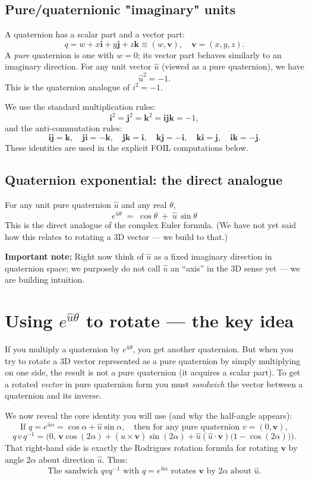 \documentclass[11pt]{article}
\begin{document}
\subsection{Pure/quaternionic "imaginary" units}
A quaternion has a scalar part and a vector part:
\[
q = w + x\mathbf{i} + y\mathbf{j} + z\mathbf{k}
  \equiv (w,\mathbf{v}),\quad \mathbf{v}=(x,y,z).
\]
A \emph{pure} quaternion is one with \(w=0\); its vector part behaves similarly to an imaginary direction. For any unit vector \(\hat{u}\) (viewed as a pure quaternion), we have
\[
\hat{u}^2 = -1.
\]
This is the quaternion analogue of \(i^2=-1\).

We use the standard multiplication rules:
\[
\mathbf{i}^2 = \mathbf{j}^2 = \mathbf{k}^2 = \mathbf{ijk} = -1,
\]
and the anti-commutation rules:
\[
\mathbf{i}\mathbf{j}=\mathbf{k},\quad \mathbf{j}\mathbf{i}=-\mathbf{k},\quad
\mathbf{j}\mathbf{k}=\mathbf{i},\quad \mathbf{k}\mathbf{j}=-\mathbf{i},\quad
\mathbf{k}\mathbf{i}=\mathbf{j},\quad \mathbf{i}\mathbf{k}=-\mathbf{j}.
\]
These identities are used in the explicit FOIL computations below.

\subsection{Quaternion exponential: the direct analogue}
For any unit pure quaternion \(\hat{u}\) and any real \(\theta\),
\[
\boxed{ \; e^{\hat{u}\theta} \;=\; \cos\theta \;+\; \hat{u}\,\sin\theta \; }
\]
This is the direct analogue of the complex Euler formula. (We have not yet said how this relates to rotating a 3D vector — we build to that.)

\bigskip
\noindent\textbf{Important note:} Right now think of \(\hat{u}\) as a fixed imaginary direction in quaternion space; we purposely do not call \(\hat{u}\) an ``axis'' in the 3D sense yet — we are building intuition.

\section{Using \(e^{\hat{u}\theta}\) to rotate — the key idea}
If you multiply a quaternion by \(e^{\hat{u}\theta}\), you get another quaternion. But when you try to rotate a 3D vector represented as a pure quaternion by simply multiplying on one side, the result is not a pure quaternion (it acquires a scalar part). To get a rotated \emph{vector} in pure quaternion form you must \emph{sandwich} the vector between a quaternion and its inverse.

We now reveal the core identity you will use (and why the half-angle appears):
\[
\text{If } q = e^{\hat{u}\alpha} = \cos\alpha + \hat{u}\sin\alpha,
\quad \text{then for any pure quaternion } v=(0,\mathbf{v}),
\]
\[
q\, v\, q^{-1}
= \big(0,\,
\mathbf{v}\cos(2\alpha) + (\hat{u}\times\mathbf{v})\sin(2\alpha)
+ \hat{u}(\hat{u}\!\cdot\!\mathbf{v})\big(1-\cos(2\alpha)\big)
\big).
\]
That right-hand side is exactly the Rodrigues rotation formula for rotating \(\mathbf{v}\)
by angle \(2\alpha\) about direction \(\hat{u}\). Thus:
\[
\boxed{\text{The sandwich } q v q^{-1} \text{ with } q=e^{\hat{u}\alpha}
\text{ rotates } \mathbf{v} \text{ by } 2\alpha \text{ about } \hat{u}.}
\]
\end{document}

